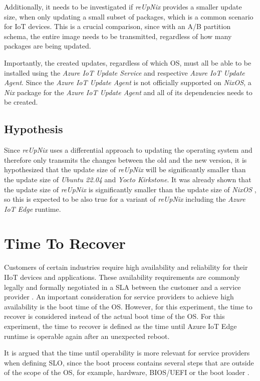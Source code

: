 Additionally, it needs to be investigated if \textit{reUpNix} provides a smaller
update size, when only updating a small subset of packages, which is a common
scenario for \ac{IoT} devices. This is a crucial comparison, since with an
A/B partition schema, the entire image needs to be transmitted, regardless of
how many packages are being updated.

Importantly, the created updates, regardless of which \ac{OS}, must all be
able to be installed using the \textit{Azure IoT Update Service} and respective
\textit{Azure IoT Update Agent}. Since the \textit{Azure IoT Update Agent} is
not officially supported on \textit{NixOS}, a \textit{Nix} package
for the \textit{Azure IoT Update Agent} and all of its dependencies needs to be created.

\subsection{Hypothesis}

Since \textit{reUpNix} uses a differential approach to updating the operating
system and therefore only transmits the changes between the old and the new
version, it is hypothesized that the update size of \textit{reUpNix} will be
significantly smaller than the update size of \textit{Ubuntu 22.04} and
\textit{Yocto Kirkstone}. It was already shown that the update size of
\textit{reUpNix} is significantly smaller than the update size of \textit{NixOS}
\cite{gollenstede:23:lctes}, so this is expected to be also true for a variant
of \textit{reUpNix} including the \textit{Azure IoT Edge} runtime.

\section{Time To Recover}
\label{sec:time-to-recover}
Customers of certain industries require high availability and reliability for
their \ac{IIoT} devices and applications. These availability requirements
are commonly legally and formally negotiated in a \ac{SLA} between
the customer and a service provider \cite{msdoc-slas}. An important consideration
for service providers to achieve high availability is the boot time of the
\ac{OS}. However, for this experiment, the time to recover is considered
instead of the actual boot time of the \ac{OS}. For this experiment, the time to recover
is defined as the time until Azure IoT Edge runtime is operable again after
an unexpected reboot.

It is argued that the time until operability is more relevant for service providers
when defining \ac{SLO}, since the boot process contains several steps that are
outside of the scope of the \ac{OS}, for example, hardware, BIOS/UEFI or the boot
loader \cite{almesberg}.


